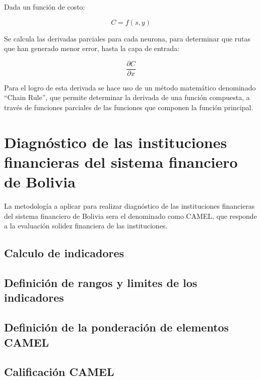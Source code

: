 \documentclass[
  12pt,
]{article}
\begin{document}
Dada un función de costo:

\[ C = f(s,y) \]

Se calcula las derivadas parciales para cada neurona, para determinar
que rutas que han generado menor error, hasta la capa de entrada:

\[ \frac{ \partial{C} }{ \partial{x} }\]

Para el logro de esta derivada se hace uso de un método matemático
denominado ``Chain Rule'', que permite determinar la derivada de una
función compuesta, a través de funciones parciales de las funciones que
componen la función principal.

\newpage

\hypertarget{diagnuxf3stico-de-las-instituciones-financieras-del-sistema-financiero-de-bolivia}{%
\section{Diagnóstico de las instituciones financieras del sistema
financiero de
Bolivia}\label{diagnuxf3stico-de-las-instituciones-financieras-del-sistema-financiero-de-bolivia}}

La metodología a aplicar para realizar diagnóstico de las instituciones
financieras del sistema financiero de Bolivia sera el denominado como
CAMEL, que responde a la evaluación solidez financiera de las
instituciones.

\hypertarget{calculo-de-indicadores-1}{%
\subsection{Calculo de indicadores}\label{calculo-de-indicadores-1}}

\hypertarget{definiciuxf3n-de-rangos-y-limites-de-los-indicadores-1}{%
\subsection{Definición de rangos y limites de los
indicadores}\label{definiciuxf3n-de-rangos-y-limites-de-los-indicadores-1}}

\hypertarget{definiciuxf3n-de-la-ponderaciuxf3n-de-elementos-camel}{%
\subsection{Definición de la ponderación de elementos
CAMEL}\label{definiciuxf3n-de-la-ponderaciuxf3n-de-elementos-camel}}

\hypertarget{calificaciuxf3n-camel-1}{%
\subsection{Calificación CAMEL}\label{calificaciuxf3n-camel-1}}
\end{document}
